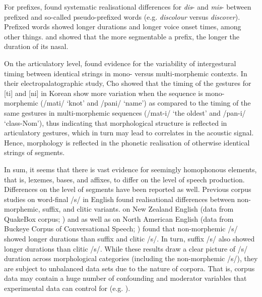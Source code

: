 For prefixes, \citet{Smith2012} found systematic realisational differences for \textit{dis}- and \textit{mis}- between prefixed and so-called pseudo-prefixed words (e.g. \textit{discolour} versus \textit{discover}). Prefixed words showed longer durations and longer voice onset times, among other things. \citet{BenHedia2017} and \citet{BenHedia2019} showed that the more segmentable a prefix, the longer the duration of its nasal.

On the articulatory level, \citet{Cho2001} found evidence for the variability of intergestural timing between identical strings in mono- versus multi-morphemic contexts. In their electropalatographic study, Cho showed that the timing of the gestures for [ti] and [ni] in Korean show more variation when the sequence is mono-morphemic (/mati/ ‘knot’ and /pani/ ‘name’) as compared to the timing of the same gestures in multi-morphemic sequences (/mat-i/ ‘the oldest’ and /pan-i/ ‘class-Nom’), thus indicating that morphological structure is reflected in articulatory gestures, which in turn may lead to correlates in the acoustic signal. Hence, morphology is reflected in the phonetic realisation of otherwise identical strings of segments.

In sum, it seems that there is vast evidence for seemingly homophonous elements, that is, lexemes, bases, and affixes, to differ on the level of speech production. Differences on the level of segments have been reported as well. Previous corpus studies on word-final /s/ in English found realisational differences between non-morphemic, suffix, and clitic variants. \citet{Zimmermann2016} on New Zealand English (data from QuakeBox corpus; \cite{Walsh2013}) and \citet{Plag2017} as well as \citet{Tomaschek2019} on North American English (data from Buckeye Corpus of Conversational Speech; \cite{Pitt2007}) found that non-morphemic /s/ showed longer durations than suffix and clitic /s/. In turn, suffix /s/ also showed longer durations than clitic /s/. While these results draw a clear picture of /s/ duration across morphological categories (including the non-morphemic /s/), they are subject to unbalanced data sets due to the nature of corpora. That is, corpus data may contain a huge number of confounding and moderator variables that experimental data can control for (e.g. \cite{Gries2015}).

